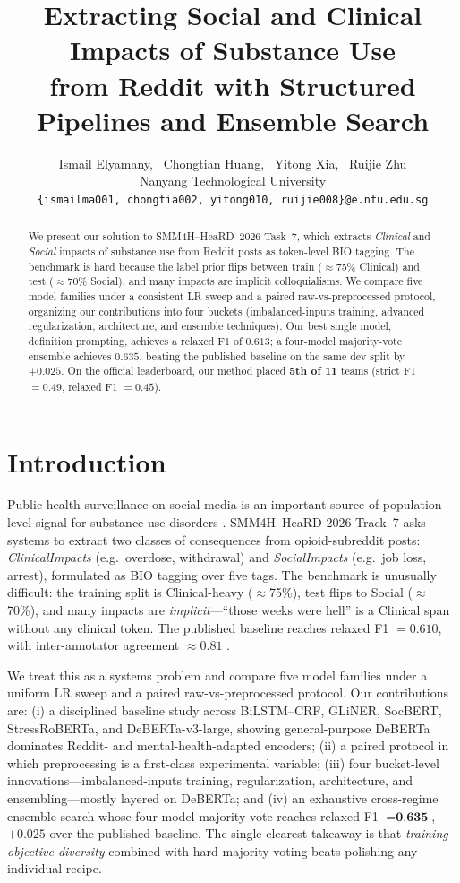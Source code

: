 \documentclass[11pt]{article}
\title{Extracting Social and Clinical Impacts of Substance Use\\
from Reddit with Structured Pipelines and Ensemble Search}
\author{Ismail Elyamany, \ Chongtian Huang, \ Yitong Xia, \ Ruijie Zhu\\
Nanyang Technological University \\
\texttt{\{ismailma001, chongtia002, yitong010, ruijie008\}@e.ntu.edu.sg}
}
\begin{document}
\maketitle

\begin{abstract}
We present our solution to SMM4H--HeaRD~2026 Task~7, which extracts \emph{Clinical} and \emph{Social} impacts of substance use from Reddit posts as token-level BIO tagging. The benchmark is hard because the label prior flips between train ($\approx$75\% Clinical) and test ($\approx$70\% Social), and many impacts are implicit colloquialisms.
We compare five model families under a consistent LR sweep and a paired raw-vs-preprocessed protocol, organizing our contributions into four buckets (imbalanced-inputs training, advanced regularization, architecture, and ensemble techniques). Our best single model, definition prompting, achieves a relaxed F1 of $ 0.613$; a four-model majority-vote ensemble achieves $0.635$, beating the published baseline on the same dev split by $+0.025$. On the official leaderboard, our method placed \textbf{5th of 11} teams (strict F1 $= 0.49$, relaxed F1 $= 0.45$). 
\end{abstract}

\section{Introduction}

Public-health surveillance on social media is an important source of
population-level signal for substance-use disorders
\citep{sarker2019social}. SMM4H--HeaRD 2026 Track~7 asks systems to extract two classes of consequences from opioid-subreddit posts:
\emph{ClinicalImpacts} (e.g.\ overdose, withdrawal) and
\emph{SocialImpacts} (e.g.\ job loss, arrest), formulated as BIO tagging
over five tags. The benchmark is unusually difficult: the training split
is Clinical-heavy ($\approx$75\%), test flips to Social ($\approx$70\%),
and many impacts are \emph{implicit}---``those weeks were hell'' is a
Clinical span without any clinical token. The published baseline reaches
relaxed F1 $= 0.610$, with inter-annotator agreement $\approx 0.81$
\citep{dey2025reddit}.

We treat this as a systems problem and compare five model families
under a uniform LR sweep and a paired raw-vs-preprocessed protocol.
Our contributions are: (i) a disciplined baseline study across
BiLSTM--CRF, GLiNER, SocBERT, StressRoBERTa, and DeBERTa-v3-large,
showing general-purpose DeBERTa dominates Reddit- and
mental-health-adapted encoders; (ii) a paired protocol in which
preprocessing is a first-class experimental variable; (iii) four
bucket-level innovations---imbalanced-inputs training, regularization,
architecture, and ensembling---mostly layered on DeBERTa; and (iv) an
exhaustive cross-regime ensemble search whose four-model majority vote
reaches relaxed F1 $= \textbf{0.635}$, $+0.025$ over the published
baseline. The single clearest takeaway is that
\emph{training-objective diversity} combined with hard majority voting
beats polishing any individual recipe.
\end{document}
